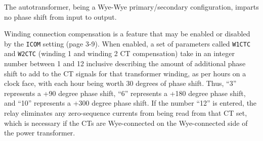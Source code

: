 \vskip 10pt

The autotransformer, being a Wye-Wye primary/secondary configuration, imparts no phase shift from input to output.

\vskip 10pt

Winding connection compensation is a feature that may be enabled or disabled by the {\tt ICOM} setting (page 3-9).  When enabled, a set of parameters called {\tt W1CTC} and {\tt W2CTC} (winding 1 and winding 2 CT compensation) take in an integer number between 1 and 12 inclusive describing the amount of additional phase shift to add to the CT signals for that transformer winding, as per hours on a clock face, with each hour being worth 30 degrees of phase shift.  Thus, ``3'' represents a +90 degree phase shift, ``6'' represents a +180 degree phase shift, and ``10'' represents a +300 degree phase shift.  If the number ``12'' is entered, the relay eliminates any zero-sequence currents from being read from that CT set, which is necessary if the CTs are Wye-connected on the Wye-connected side of the power transformer.




